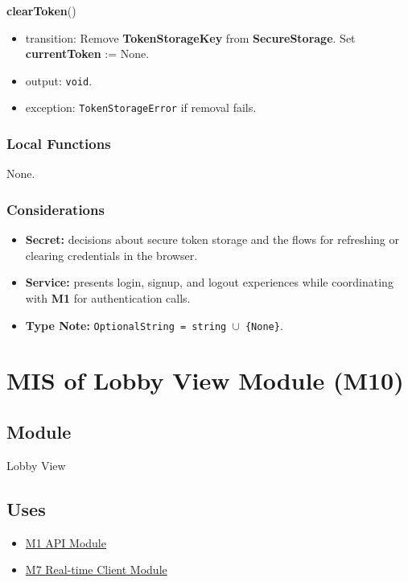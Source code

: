 \documentclass[12pt, titlepage]{article}
\begin{document}
\noindent\textbf{clearToken}()
\begin{itemize}
    \item transition: Remove \textbf{TokenStorageKey} from \textbf{SecureStorage}. Set \textbf{currentToken} := None.
    \item output: \texttt{void}.
    \item exception: \texttt{TokenStorageError} if removal fails.
\end{itemize}

\subsubsection{Local Functions}
None.

\subsubsection{Considerations}
\begin{itemize}
    \item \textbf{Secret:} decisions about secure token storage and the flows for refreshing or clearing credentials in the browser.
    \item \textbf{Service:} presents login, signup, and logout experiences while coordinating with \textbf{M1} for authentication calls.
    \item \textbf{Type Note:} \texttt{OptionalString = string $\cup$ \{None\}}.
\end{itemize}

\newpage
\section{MIS of Lobby View Module (M10)}\label{sec:lobby-view-module}

\subsection{Module}
Lobby View

\subsection{Uses}
\begin{itemize}
    \item \hyperref[sec:api-module]{M1 API Module}
    \item \hyperref[sec:realtime-client-module]{M7 Real-time Client Module}
\end{itemize}
\end{document}
